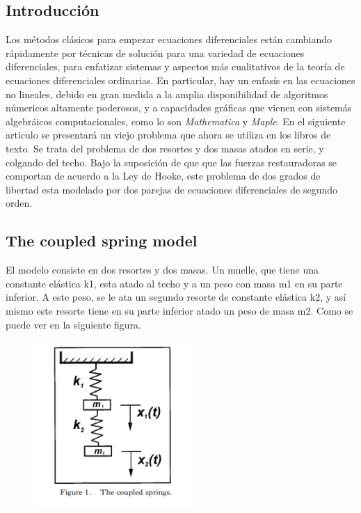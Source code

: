 \documentclass{article}
\begin{document}
\subsection{Introducción}
Los métodos clásicos para empezar ecuaciones diferenciales están cambiando rápidamente por técnicas de solución para una variedad de ecuaciones diferenciales, para enfatizar sistemas y aspectos más cualitativos de la teoría de ecuaciones diferenciales ordinarias. En particular, hay un enfasís en las ecuaciones no lineales, debido en gran medida a la amplia disponibilidad de algoritmos númericos altamente poderosos, y a capacidades gráficas que vienen con sistemás algebráicos computacionales, como lo son \textit{Mathematica} y \textit{Maple}.
En el siguiente articulo se presentará un viejo problema que ahora se utiliza en los libros de texto. Se trata del problema de dos resortes y dos masas atados en serie, y colgando del techo. Bajo la suposición de que que las fuerzas restauradoras se comportan de acuerdo a la Ley de Hooke, este problema de dos grados de libertad esta modelado por dos parejas de ecuaciones diferenciales de segundo orden.

\subsection{The coupled spring model}
El modelo consiste en dos resortes y dos masas. Un muelle, que tiene una constante elástica k1, esta atado al techo y a un peso con masa m1 en su parte inferior.
A este peso, se le ata un segundo resorte de constante elástica k2, y así mismo este resorte tiene en su parte inferior atado un peso de masa m2. Como se puede ver en la siguiente figura.

\begin{figure}[htb]
    \begin{center}
    \includegraphics[width=6cm]{Figura1.PNG}
    \end{center}
\end{figure}
\end{document}

